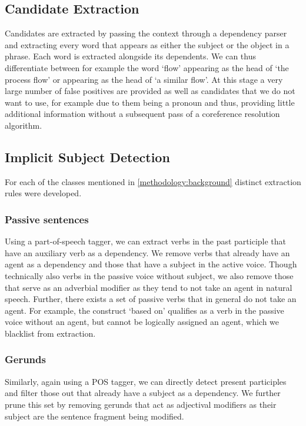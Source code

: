 \documentclass[times, 10pt,twocolumn]{article}
\begin{document}
\subsection{Candidate Extraction}
Candidates are extracted by passing the context through a dependency parser and extracting every word that
appears as either the subject or the object in a phrase. Each word is extracted alongside its dependents.
We can thus differentiate between for example the word `flow' appearing as the head of `the process flow'
or appearing as the head of `a similar flow'. At this stage a very large number of false positives
are provided as well as candidates that we do not want to use, for example due to them being a pronoun
and thus, providing little additional information without a subsequent pass of a coreference resolution
algorithm.


\subsection{Implicit Subject Detection}
For each of the classes mentioned in \ref{methodology:background} distinct extraction rules were developed.

\subsubsection{Passive sentences}
Using a part-of-speech tagger, we can extract verbs in the past participle that have an
auxiliary verb as a dependency. We remove verbs that
already have an agent as a dependency and those that have a subject in the active voice.
Though technically also verbs in the passive voice without subject, we also remove those that
serve as an adverbial modifier as they tend to not take an agent in natural speech.
Further, there exists a set of passive verbs that in general do not take an agent.
For example, the construct `based on' qualifies as a verb in the passive voice without an agent,
but cannot be logically assigned an agent, which we blacklist from extraction.  

\subsubsection{Gerunds}
Similarly, again using a POS tagger, we can directly detect present participles and filter those
out that already have a subject as a dependency. We further prune this set by removing gerunds that
act as adjectival modifiers as their subject are the sentence fragment being modified. 
\end{document}

